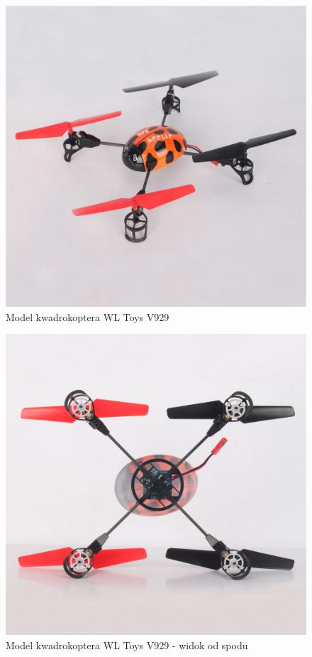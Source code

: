 \documentclass[11pt, twoside]{Thesis} %
\begin{document}
\begin{figure}[H]
	\centering
	\includegraphics[scale=0.3]{Pictures/Quadro_beetle2.jpg}
		\caption[Model kwadrokoptera WL Toys V929]{Model kwadrokoptera WL Toys V929}
	\label{fig:Quadro_beetle2}
\end{figure}

\begin{figure}[H]
	\centering
	\includegraphics[scale=0.3]{Pictures/Quadro_beetle3.jpg}
		\caption[Model kwadrokoptera WL Toys V929 - widok od spodu]{Model kwadrokoptera WL Toys V929 - widok od spodu}
	\label{fig:Quadro_beetle3}
\end{figure}
\end{document}

